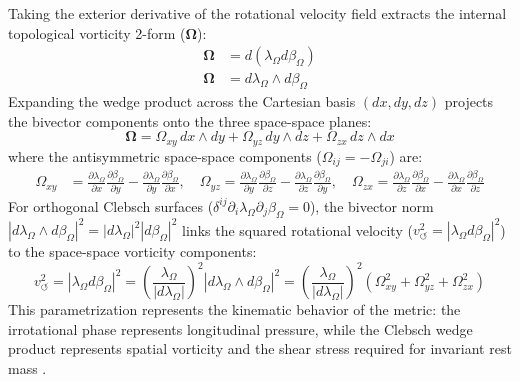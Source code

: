 Taking the exterior derivative of the rotational velocity field extracts the internal topological vorticity 2-form ($\boldsymbol{\Omega}$):
\begin{align}
    \boldsymbol{\Omega} &= d(\lambda_\Omega d\beta_\Omega) \nonumber \\ 
    \boldsymbol{\Omega} &= d\lambda_\Omega \wedge d\beta_\Omega \label{eq:tensor_vorticity} 
\end{align}
Expanding the wedge product across the Cartesian basis $(dx, dy, dz)$ projects the bivector components onto the three space-space planes: %
\begin{equation} %
    \boldsymbol{\Omega} = \Omega_{xy}\,dx \wedge dy + \Omega_{yz}\,dy \wedge dz + \Omega_{zx}\,dz \wedge dx \label{eq:tensor_vorticity_planes} %
\end{equation} %
where the antisymmetric space-space components ($\Omega_{ij} = -\Omega_{ji}$) are: %
\begin{align} %
    \Omega_{xy} &= \frac{\partial\lambda_\Omega}{\partial x}\frac{\partial\beta_\Omega}{\partial y} - \frac{\partial\lambda_\Omega}{\partial y}\frac{\partial\beta_\Omega}{\partial x}, \quad \Omega_{yz} = \frac{\partial\lambda_\Omega}{\partial y}\frac{\partial\beta_\Omega}{\partial z} - \frac{\partial\lambda_\Omega}{\partial z}\frac{\partial\beta_\Omega}{\partial y}, \quad \Omega_{zx} = \frac{\partial\lambda_\Omega}{\partial z}\frac{\partial\beta_\Omega}{\partial x} - \frac{\partial\lambda_\Omega}{\partial x}\frac{\partial\beta_\Omega}{\partial z} \label{eq:tensor_omega_xyz} %
\end{align} %
For orthogonal Clebsch surfaces ($\delta^{ij}\partial_i\lambda_\Omega\partial_j\beta_\Omega = 0$), the bivector norm $|d\lambda_\Omega \wedge d\beta_\Omega|^2 = |d\lambda_\Omega|^2 |d\beta_\Omega|^2$ links the squared rotational velocity ($v_\circlearrowleft^2 = |\lambda_\Omega d\beta_\Omega|^2$) to the space-space vorticity components: %
\begin{equation} %
    v_\circlearrowleft^2 = |\lambda_\Omega d\beta_\Omega|^2 = \left(\frac{\lambda_\Omega}{|d\lambda_\Omega|}\right)^2 |d\lambda_\Omega \wedge d\beta_\Omega|^2 = \left(\frac{\lambda_\Omega}{|d\lambda_\Omega|}\right)^2 \left(\Omega_{xy}^2 + \Omega_{yz}^2 + \Omega_{zx}^2\right) \label{eq:tensor_v_rot_clebsch} %
\end{equation} %
This parametrization represents the kinematic behavior of the metric: the irrotational phase represents longitudinal pressure, while the Clebsch wedge product represents spatial vorticity and the shear stress required for invariant rest mass \cite{Volovik2003}. 

